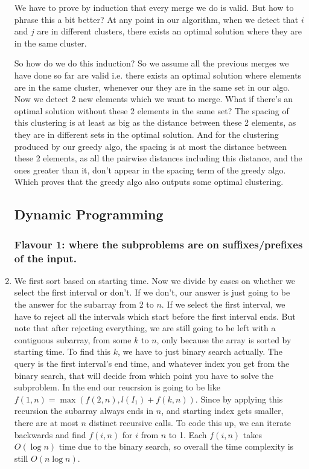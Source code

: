\documentclass[12pt]{report}
\begin{document}
\begin{enumerate}[label=\textbf{\arabic*.}]
  We have to prove by induction that every merge we do is valid. But how to phrase this a bit better? At any point in our algorithm, when we detect that $i$ and $j$ are in different clusters, 
  there exists an optimal solution where they are in the same cluster.

  So how do we do this induction? So we assume all the previous merges we have done so far are valid i.e. there exists an optimal solution where elements are in the same cluster, whenever our 
  they are in the same set in our algo. Now we detect 2 new elements which we want to merge. What if there's an optimal solution without these 2 elements in the same set? The spacing of this 
  clustering is at least as big as the distance between these 2 elements, as they are in different sets in the optimal solution. And for the clustering produced by our greedy algo, the spacing
  is at most the distance between these 2 elements, as all the pairwise distances including this distance, and the ones greater than it, don't appear in the spacing term of the greedy algo. Which 
  proves that the greedy algo also outputs some optimal clustering.

  \subsection*{\Large\bfseries Dynamic Programming}

  \subsubsection*{Flavour 1: where the subproblems are on suﬃxes/preﬁxes of the input.}

  \item We first sort based on starting time. Now we divide by cases on whether we select the first interval or don't. If we don't, our answer is just going to be the answer for the subarray from
  2 to $n$. If we select the first interval, we have to reject all the intervals which start before the first interval ends. But note that after rejecting everything, we are still going to be left 
  with a contiguous subarray, from some $k$ to $n$, only because the array is sorted by starting time. To find this $k$, we have to just binary search actually. The query is the first interval's 
  end time, and whatever index you get from the binary search, that will decide from which point you have to solve the subproblem. In the end our reucrsion is going to be like
  $f(1, n) = \max(f(2,n), l(I_1)+f(k,n))$. Since by applying this recursion the subarray always ends in $n$, and starting index gets smaller, there are at most $n$ distinct recursive calls. To code this 
  up, we can iterate backwards and find $f(i, n)$ for $i$ from $n$ to 1. Each $f(i, n)$ takes $O(\log n)$ time due to the binary search, so overall the time complexity is still $O(n \log n)$.


\end{enumerate}
\end{document}
